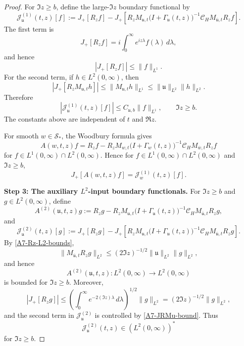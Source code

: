 \documentclass[10pt,a4paper]{amsart}
\begin{document}
\begin{proof}
For \(\Im z\ge b\), define the large-\(\Im z\) boundary functional by
\begin{equation}
\label{A7-J1-large-def}
\mathcal J^{(1)}_{\mathfrak u}(t,z)[f]
:=
J_+[R_zf]
-
J_+\left[
R_zM_{\mathfrak u,t}
\bigl(I+\Gamma_{\mathfrak u}(t,z)\bigr)^{-1}
\mathcal C_HM_{\overline{\mathfrak u},t}R_zf
\right].
\end{equation}
The first term is
\[
J_+[R_zf]
=
i\int_0^\infty e^{iz\lambda}f(\lambda)\,d\lambda,
\]
and hence
\begin{equation}
\label{A7-free-boundary-L1}
|J_+[R_zf]|
\le
\|f\|_{L^1}.
\end{equation}
For the second term, if \(h\in L^2(0,\infty)\), then
\begin{equation}
\label{A7-JRMu-bound}
|J_+[R_zM_{\mathfrak u,t}h]|
\le
\|M_{\mathfrak u,t}h\|_{L^1}
\le
\|\mathfrak u\|_{L^2}\|h\|_{L^2}.
\end{equation}
Therefore
\begin{equation}
\label{A7-J1-large-bound}
|\mathcal J^{(1)}_{\mathfrak u}(t,z)[f]|
\le
C_{\mathfrak u,b}\|f\|_{L^1},
\qquad \Im z\ge b.
\end{equation}
The constants above are independent of \(t\) and \(\Re z\).

For smooth \(w\in\mathcal S_*\), the Woodbury formula gives
\[
A(w,t,z)f
=
R_zf
-
R_zM_{w,t}
\bigl(I+\Gamma_w(t,z)\bigr)^{-1}
\mathcal C_HM_{\overline w,t}R_zf
\]
for \(f\in L^1(0,\infty)\cap L^2(0,\infty)\). Hence for \(f\in L^1(0,\infty)\cap L^2(0,\infty)\) and $\Im z \ge b$, 
\[
J_+[A(w,t,z)f]
=
\mathcal J^{(1)}_w(t,z)[f].
\]

\medskip
\noindent
\textbf{Step 3: The auxiliary \(L^2\)-input boundary functionals.}
For \(\Im z\ge b\) and \(g\in L^2(0,\infty)\), define
\begin{equation}
\label{A7-A2-large-def}
A^{(2)}(\mathfrak u,t,z)g
:=
R_zg
-
R_zM_{\mathfrak u,t}
\bigl(I+\Gamma_{\mathfrak u}(t,z)\bigr)^{-1}
\mathcal C_HM_{\overline{\mathfrak u},t}R_zg ,
\end{equation}
and
\begin{equation}
\label{A7-J2-large-def}
\mathcal J^{(2)}_{\mathfrak u}(t,z)[g]
:=
J_+[R_zg]
-
J_+\left[
R_zM_{\mathfrak u,t}
\bigl(I+\Gamma_{\mathfrak u}(t,z)\bigr)^{-1}
\mathcal C_HM_{\overline{\mathfrak u},t}R_zg
\right].
\end{equation}
By \eqref{A7-Rz-L2-bounds},
\[
\|M_{\overline{\mathfrak u},t}R_zg\|_{L^2}
\le
(2\Im z)^{-1/2}\|\mathfrak u\|_{L^2}\|g\|_{L^2},
\]
and hence
\[
A^{(2)}(\mathfrak u,t,z):L^2(0,\infty)\to L^2(0,\infty)
\]
is bounded for \(\Im z\ge b\). Moreover,
\[
|J_+[R_zg]|
\le
\left(\int_0^\infty e^{-2(\Im z)\lambda}\,d\lambda\right)^{1/2}
\|g\|_{L^2}
=
(2\Im z)^{-1/2}\|g\|_{L^2},
\]
and the second term in \(\mathcal J^{(2)}_{\mathfrak u}\) is controlled by
\eqref{A7-JRMu-bound}. Thus
\[
\mathcal J^{(2)}_{\mathfrak u}(t,z)\in (L^2(0,\infty))^*
\]
for \(\Im z\ge b\).


\end{proof}
\end{document}
